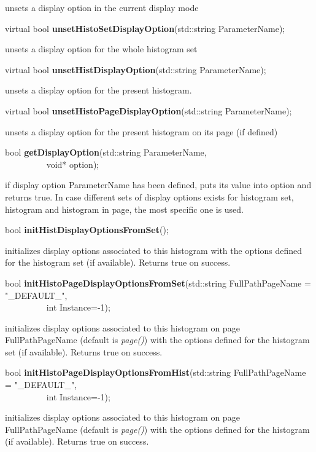  unsets a display option in the current display mode


\item    virtual bool {\bf unsetHistoSetDisplayOption}(std::string ParameterName); 


 unsets a display option for the whole histogram set


\item    virtual bool {\bf unsetHistDisplayOption}(std::string ParameterName); 


 unsets a display option for the present histogram.


\item    virtual bool {\bf unsetHistoPageDisplayOption}(std::string ParameterName);


 unsets a display option for the present histogram on its page (if defined)


\item    bool {\bf getDisplayOption}(std::string ParameterName,\\\mbox{}~~~~~~~~~
			void* option);

 if display option  ParameterName has been defined, puts its value into
 option and returns true. In case different sets of display options
 exists for histogram set, histogram and histogram in page, the most
 specific one is used.


\item    bool {\bf initHistDisplayOptionsFromSet}(); 


 initializes display options associated to this histogram with the
 options defined for the histogram set (if available). Returns true on
 success.


\item    bool {\bf initHistoPageDisplayOptionsFromSet}(std::string FullPathPageName = "\_DEFAULT\_",\\\mbox{}~~~~~~~~~
					  int Instance=-1);

 initializes display options associated to this histogram on page
 FullPathPageName (default is {\it page()}) with the
 options defined for the histogram set (if available). Returns true on
 success.


\item    bool {\bf initHistoPageDisplayOptionsFromHist}(std::string FullPathPageName = "\_DEFAULT\_",\\\mbox{}~~~~~~~~~
					   int Instance=-1);

 initializes display options associated to this histogram on page
 FullPathPageName (default is {\it page()}) with the
 options defined for the histogram (if available). Returns true on
 success.


